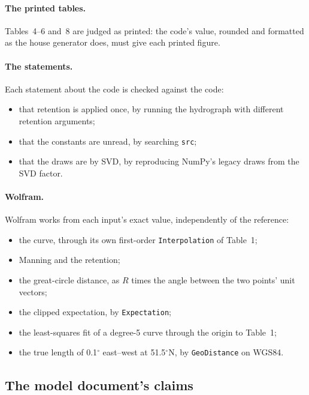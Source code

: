 \documentclass[11pt,a4paper]{article}
\begin{document}
\paragraph{The printed tables.} Tables~4--6 and~8 are judged as printed: the code's
value, rounded and formatted as the house generator does, must give each printed figure.

\paragraph{The statements.} Each statement about the code is checked against the code:
\begin{itemize}[leftmargin=*,nosep]
\item that retention is applied once, by running the hydrograph with different
  retention arguments;
\item that the constants are unread, by searching \texttt{src};
\item that the draws are by SVD, by reproducing NumPy's legacy draws from the SVD
  factor.
\end{itemize}

\paragraph{Wolfram.} Wolfram works from each input's exact value, independently of the
reference:
\begin{itemize}[leftmargin=*,nosep]
\item the curve, through its own first-order \texttt{Interpolation} of Table~1;
\item Manning and the retention;
\item the great-circle distance, as $R$ times the angle between the two points' unit
  vectors;
\item the clipped expectation, by \texttt{Expectation};
\item the least-squares fit of a degree-5 curve through the origin to Table~1;
\item the true length of 0.1$^\circ$ east--west at 51.5$^\circ$N, by
  \texttt{GeoDistance} on WGS84.
\end{itemize}

\mkmvalidation



\subsection{The model document's claims}

\end{document}
